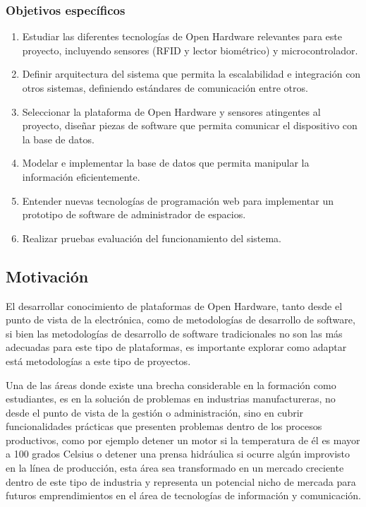 \subsubsection{Objetivos específicos}


\begin{enumerate}
\item Estudiar las diferentes tecnologías de Open Hardware relevantes para este proyecto, incluyendo sensores (RFID y lector biométrico) y microcontrolador.
\item Definir arquitectura del sistema que permita la escalabilidad e integración con otros sistemas, definiendo estándares de comunicación entre otros.
\item Seleccionar la plataforma de Open Hardware y sensores atingentes al proyecto, diseñar piezas de software que permita comunicar el dispositivo con la base de datos.
\item Modelar e implementar la base de datos que permita manipular la información eficientemente.
\item Entender nuevas tecnologías de programación web para implementar un prototipo de software de administrador de espacios.
\item Realizar pruebas evaluación del funcionamiento del sistema.
\end{enumerate}

\vspace{0.5cm}

\subsection{Motivación}
El desarrollar conocimiento de plataformas de Open Hardware, tanto desde el punto de vista de la electrónica, como de metodologías de desarrollo de software, si bien las metodologías de desarrollo de software tradicionales no son las más adecuadas para este tipo de plataformas, es importante explorar como adaptar está metodologías a este tipo de proyectos.

Una de las áreas donde existe una brecha considerable en la formación como estudiantes, es en la solución de problemas en industrias manufactureras, no desde el punto de vista de la gestión o administración, sino en cubrir funcionalidades prácticas que presenten problemas dentro de los procesos productivos, como por ejemplo detener un motor si la temperatura de él es mayor a 100 grados Celsius o detener una prensa hidráulica si ocurre algún improvisto en la línea de producción, esta área sea transformado en un mercado creciente dentro de este tipo de industria\cite{Ind09} y representa un potencial nicho de mercada para futuros emprendimientos en el área de tecnologías de información y comunicación.

